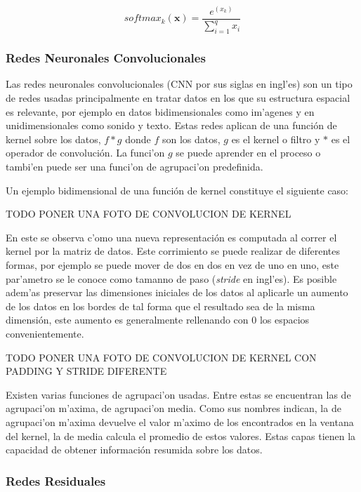 \begin{equation}
	softmax_k(\textbf{x}) = \frac{e^(x_k)}{\sum_{i=1}^q x_i}
\end{equation}\label{eq:softmax}

\subsubsection{Redes Neuronales Convolucionales}

Las redes neuronales convolucionales (CNN por sus siglas en ingl'es) son un tipo de redes usadas
principalmente en tratar datos en los que su estructura espacial es relevante, por ejemplo
en datos bidimensionales como im'agenes y en unidimensionales como sonido y texto.
Estas redes aplican de una función de kernel sobre los datos, $f * g$ donde $f$ son los
datos, $g$ es el kernel o filtro y $*$ es el operador de convolución. La funci'on $g$ se puede 
aprender en el proceso o tambi'en puede ser una funci'on de agrupaci'on predefinida.   

Un ejemplo bidimensional de una función de kernel constituye el siguiente caso:

TODO PONER UNA FOTO DE CONVOLUCION DE KERNEL

En este se observa c'omo una nueva representación es computada al correr el kernel por la matriz de datos. Este
corrimiento se puede realizar de diferentes formas, por ejemplo se puede mover de dos en dos en vez de uno en uno, este
par'ametro se le conoce como tamanno de paso (\emph{stride} en ingl'es). Es posible adem'as preservar las dimensiones
iniciales de los datos al aplicarle un aumento de los datos en los bordes de tal forma que el resultado sea de la misma
dimensión, este aumento es generalmente rellenando con 0 los espacios convenientemente.

TODO PONER UNA FOTO DE CONVOLUCION DE KERNEL CON PADDING Y STRIDE DIFERENTE

Existen varias funciones de agrupaci'on usadas. Entre estas se encuentran las de agrupaci'on m'axima, de 
agrupaci'on media. Como sus nombres indican, la de agrupaci'on m'axima devuelve el valor m'aximo de los encontrados
en la ventana del kernel, la de media calcula el promedio de estos valores. Estas capas tienen la capacidad de obtener
información resumida sobre los datos.

\subsubsection{Redes Residuales}

